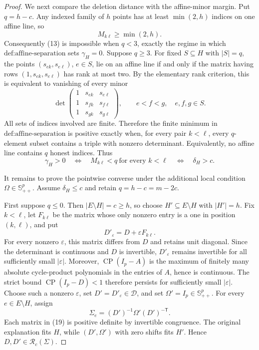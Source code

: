 \documentclass{article}
\begin{document}
\begin{proof}
We next compare the deletion distance with the affine-minor margin.  Put \(q=h-c\).  Any indexed family of \(h\) points has at least \(\min(2,h)\) indices on one affine line, so
\[
 M_{k\ell}\ge\min(2,h).
 \tag{15}
\]
Consequently (13) is impossible when \(q<3\), exactly the regime in which \(\text{def:affine-separation}\) sets \(\gamma_H=0\).  Suppose \(q\ge3\).  For fixed \(S\subseteq H\) with \(|S|=q\), the points \((s_{ek},s_{e\ell})\), \(e\in S\), lie on an affine line if and only if the matrix having rows \((1,s_{ek},s_{e\ell})\) has rank at most two.  By the elementary rank criterion, this is equivalent to vanishing of every minor
\[
 \det\begin{pmatrix}
 1&s_{ek}&s_{e\ell}\\
 1&s_{fk}&s_{f\ell}\\
 1&s_{gk}&s_{g\ell}
 \end{pmatrix},
 \qquad e<f<g,\quad e,f,g\in S.
 \tag{16}
\]
All sets of indices involved are finite.  Therefore the finite minimum in \(\text{def:affine-separation}\) is positive exactly when, for every pair \(k<\ell\), every \(q\)-element subset contains a triple with nonzero determinant.  Equivalently, no affine line contains \(q\) honest indices.  Thus
\[
 \gamma_H>0
 \quad\Longleftrightarrow\quad
 M_{k\ell}<q\ \text{for every }k<\ell
 \quad\Longleftrightarrow\quad
 \delta_H>c.
 \tag{17}
\]

It remains to prove the pointwise converse under the additional local condition \(\Omega\in\mathbb S_{++}^p\).  Assume \(\delta_H\le c\) and retain \(q=h-c=m-2c\).

First suppose \(q\le0\).  Then \(|E\setminus H|=c\ge h\), so choose \(H'\subseteq E\setminus H\) with \(|H'|=h\).  Fix \(k<\ell\), let \(F_{k\ell}\) be the matrix whose only nonzero entry is a one in position \((k,\ell)\), and put
\[
 D'_{\varepsilon}=D+\varepsilon F_{k\ell}.
 \tag{18}
\]
For every nonzero \(\varepsilon\), this matrix differs from \(D\) and retains unit diagonal.  Since the determinant is continuous and \(D\) is invertible, \(D'_{\varepsilon}\) remains invertible for all sufficiently small \(|\varepsilon|\).  Moreover, \(\operatorname{CP}(I_p-A)\) is the maximum of finitely many absolute cycle-product polynomials in the entries of \(A\), hence is continuous.  The strict bound \(\operatorname{CP}(I_p-D)<1\) therefore persists for sufficiently small \(|\varepsilon|\).  Choose such a nonzero \(\varepsilon\), set \(D'=D'_{\varepsilon}\in\mathcal D\), and set \(\Omega'=I_p\in\mathbb S_{++}^p\).  For every \(e\in E\setminus H\), assign
\[
 \Sigma_e=(D')^{-1}\Omega'(D')^{-\mathsf T}.
 \tag{19}
\]
Each matrix in (19) is positive definite by invertible congruence.  The original explanation fits \(H\), while \((D',\Omega')\) with zero shifts fits \(H'\).  Hence \(D,D'\in\mathcal R_c(\Sigma)\).


\end{proof}
\end{document}
